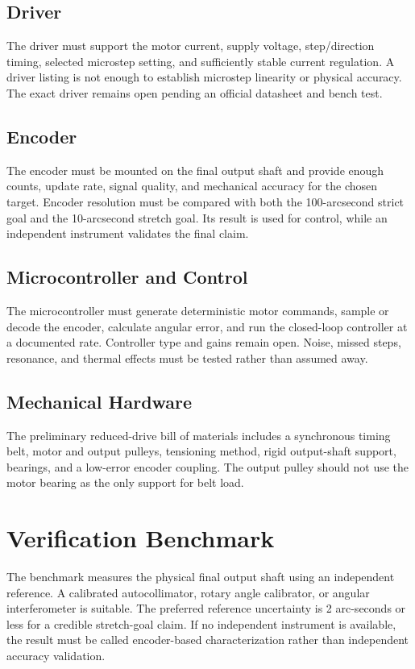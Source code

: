 \documentclass[11pt,a4paper]{article}
\begin{document}
\subsection{Driver}
The driver must support the motor current, supply voltage, step/direction timing, selected microstep setting, and sufficiently stable current regulation. A driver listing is not enough to establish microstep linearity or physical accuracy. The exact driver remains open pending an official datasheet and bench test.

\subsection{Encoder}
The encoder must be mounted on the final output shaft and provide enough counts, update rate, signal quality, and mechanical accuracy for the chosen target. Encoder resolution must be compared with both the 100-arcsecond strict goal and the 10-arcsecond stretch goal. Its result is used for control, while an independent instrument validates the final claim.

\subsection{Microcontroller and Control}
The microcontroller must generate deterministic motor commands, sample or decode the encoder, calculate angular error, and run the closed-loop controller at a documented rate. Controller type and gains remain open. Noise, missed steps, resonance, and thermal effects must be tested rather than assumed away.

\subsection{Mechanical Hardware}
The preliminary reduced-drive bill of materials includes a synchronous timing belt, motor and output pulleys, tensioning method, rigid output-shaft support, bearings, and a low-error encoder coupling. The output pulley should not use the motor bearing as the only support for belt load.

\section{Verification Benchmark}

The benchmark measures the physical final output shaft using an independent reference. A calibrated autocollimator, rotary angle calibrator, or angular interferometer is suitable. The preferred reference uncertainty is 2 arc-seconds or less for a credible stretch-goal claim. If no independent instrument is available, the result must be called encoder-based characterization rather than independent accuracy validation.
\end{document}
